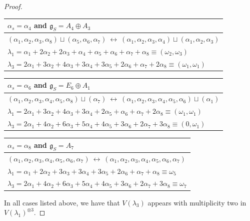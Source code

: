 \documentclass[a4paper, 12pt, reqno, english]{amsart}
\numberwithin{equation}{section}
\numberwithin{figure}{section}
\theoremstyle{plain}
\theoremstyle{plain}
\theoremstyle{plain}
\theoremstyle{plain}
\theoremstyle{plain}
\theoremstyle{definition}
\theoremstyle{definition}
\theoremstyle{definition}
\theoremstyle{remark}
\theoremstyle{definition}
\theoremstyle{definition}
\newcommand{\lieg}{\mathfrak{g}}
\begin{document}
\begin{proof}
{\renewcommand{\arraystretch}{1.4}
\begin{center}
\begin{tabular}{|l|} 
\hline
$\alpha_s = \alpha_4$ and $\lieg_S = A_4 \oplus A_3$ \\
\hline \hline
$(\alpha_1, \alpha_2, \alpha_3, \alpha_8) \sqcup (\alpha_5, \alpha_6, \alpha_7) \ \leftrightarrow \ (\alpha_1, \alpha_2, \alpha_3, \alpha_4) \sqcup (\alpha_1, \alpha_2, \alpha_3)$ \\
\hline
$\lambda_1 = \alpha_1 + 2 \alpha_2 + 2 \alpha_3 + \alpha_4 + \alpha_5 + \alpha_6 + \alpha_7 + \alpha_8 \equiv (\omega_2, \omega_3)$ \\
\hline
$\lambda_3 = 2 \alpha_1 + 3 \alpha_2 + 4 \alpha_3 + 3 \alpha_4 + 3 \alpha_5 + 2 \alpha_6 + \alpha_7 + 2 \alpha_8 \equiv (\omega_1, \omega_1)$ \\
\hline
\end{tabular}
\end{center}}

{\renewcommand{\arraystretch}{1.4}
\begin{center}
\begin{tabular}{|l|} 
\hline
$\alpha_s = \alpha_6$ and $\lieg_S = E_6 \oplus A_1$ \\
\hline \hline
$(\alpha_1, \alpha_2, \alpha_3, \alpha_4, \alpha_5, \alpha_8) \sqcup (\alpha_7) \ \leftrightarrow \ (\alpha_1, \alpha_2, \alpha_3, \alpha_4, \alpha_5, \alpha_6) \sqcup (\alpha_1)$ \\
\hline
$\lambda_1 = 2 \alpha_1 + 3 \alpha_2 + 4 \alpha_3 + 3 \alpha_4 + 2 \alpha_5 + \alpha_6 + \alpha_7 + 2 \alpha_8 \equiv (\omega_1, \omega_1)$ \\
\hline
$\lambda_3 = 2 \alpha_1 + 4 \alpha_2 + 6 \alpha_3 + 5 \alpha_4 + 4 \alpha_5 + 3 \alpha_6 + 2 \alpha_7 + 3 \alpha_8 \equiv (0, \omega_1)$ \\
\hline
\end{tabular}
\end{center}}

{\renewcommand{\arraystretch}{1.4}
\begin{center}
\begin{tabular}{|l|} 
\hline
$\alpha_s = \alpha_8$ and $\lieg_S = A_7$ \\
\hline \hline
$(\alpha_1, \alpha_2, \alpha_3, \alpha_4, \alpha_5, \alpha_6, \alpha_7) \ \leftrightarrow \ (\alpha_1, \alpha_2, \alpha_3, \alpha_4, \alpha_5, \alpha_6, \alpha_7)$ \\
\hline
$\lambda_1 = \alpha_1 + 2 \alpha_2 + 3 \alpha_3 + 3 \alpha_4 + 3 \alpha_5 + 2 \alpha_6 + \alpha_7 + \alpha_8 \equiv \omega_5$ \\
\hline
$\lambda_3 = 2 \alpha_1 + 4 \alpha_2 + 6 \alpha_3 + 5 \alpha_4 + 4 \alpha_5 + 3 \alpha_6 + 2 \alpha_7 + 3 \alpha_8 \equiv \omega_7$ \\
\hline
\end{tabular}
\end{center}}

In all cases listed above, we have that $V(\lambda_3)$ appears with multiplicity two in $V(\lambda_1)^{\otimes 3}$.
\end{proof}
\end{document}
